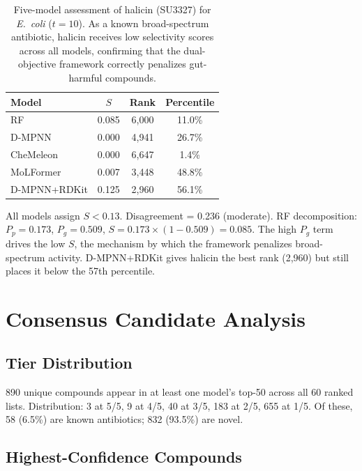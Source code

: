 \documentclass{article}
\begin{document}
\begin{table}[ht]
\caption{Five-model assessment of halicin (SU3327) for \textit{E.~coli} ($t{=}10$). As a known broad-spectrum antibiotic, halicin receives low selectivity scores across all models, confirming that the dual-objective framework correctly penalizes gut-harmful compounds.}
\label{tab:halicin}
\centering
\scriptsize
\begin{tabular}{lccc}
\toprule
\textbf{Model} & $S$ & \textbf{Rank} & \textbf{Percentile} \\
\midrule
RF & 0.085 & 6,000 & 11.0\% \\
D-MPNN & 0.000 & 4,941 & 26.7\% \\
CheMeleon & 0.000 & 6,647 & 1.4\% \\
MoLFormer & 0.007 & 3,448 & 48.8\% \\
D-MPNN+RDKit & 0.125 & 2,960 & 56.1\% \\
\bottomrule
\end{tabular}
\end{table}

All models assign $S < 0.13$.
Disagreement = 0.236 (moderate).
RF decomposition: $P_p = 0.173$, $P_g = 0.509$, $S = 0.173 \times (1 - 0.509) = 0.085$.
The high $P_g$ term drives the low $S$, the mechanism by which the framework penalizes broad-spectrum activity.
D-MPNN+RDKit gives halicin the best rank (2,960) but still places it below the 57th percentile.


\section{Consensus Candidate Analysis}
\label{app:consensus}

\subsection{Tier Distribution}

890 unique compounds appear in at least one model's top-50 across all 60 ranked lists.
Distribution: 3 at 5/5, 9 at 4/5, 40 at 3/5, 183 at 2/5, 655 at 1/5.
Of these, 58 (6.5\%) are known antibiotics; 832 (93.5\%) are novel.

\subsection{Highest-Confidence Compounds}
\end{document}
